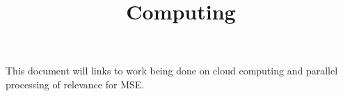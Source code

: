 \documentclass[a4paper,10pt]{article}
\title{Computing}
\author{}
\begin{document}
\maketitle

This document will links to work being done on cloud computing and parallel processing of relevance for MSE.

  
\end{document}
